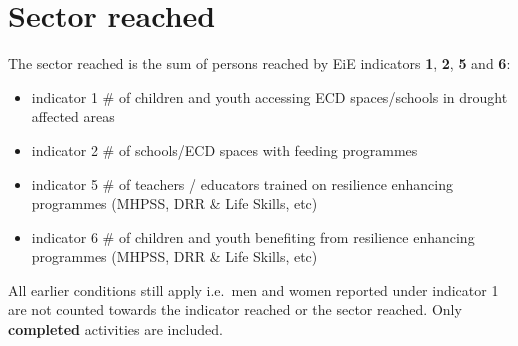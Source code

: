 \documentclass[
]{article}
\begin{document}
\renewcommand*{\arraystretch}{1}

\hypertarget{sector-reached}{%
\section{Sector reached}\label{sector-reached}}

The sector reached is the sum of persons reached by EiE indicators
\textbf{1}, \textbf{2}, \textbf{5} and \textbf{6}:

\begin{itemize}
\item
  indicator 1 \# of children and youth accessing ECD spaces/schools in
  drought affected areas
\item
  indicator 2 \# of schools/ECD spaces with feeding programmes
\item
  indicator 5 \# of teachers / educators trained on resilience enhancing
  programmes (MHPSS, DRR \& Life Skills, etc)
\item
  indicator 6 \# of children and youth benefiting from resilience
  enhancing programmes (MHPSS, DRR \& Life Skills, etc)
\end{itemize}

All earlier conditions still apply i.e.~men and women reported under
indicator 1 are not counted towards the indicator reached or the sector
reached. Only \textbf{completed} activities are included.
\end{document}

